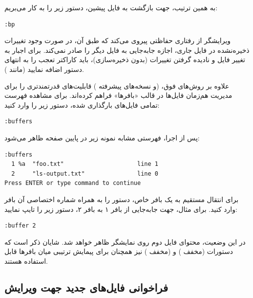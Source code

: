به همین ترتیب، جهت بازگشت به فایل پیشین، دستور زیر را به کار می‌بریم:

\begin{latin}
\begin{lstlisting}
:bp
\end{lstlisting}
\end{latin}

ویرایشگر  از رفتاری حفاظتی پیروی می‌کند که طبق آن، در صورت وجود تغییرات ذخیره‌نشده در فایل جاری، اجازه جابه‌جایی به فایل دیگر را صادر نمی‌کند. برای اجبار  به تغییر فایل و نادیده گرفتن تغییرات (بدون ذخیره‌سازی)، باید کاراکتر تعجب \cmd{!} را به انتهای دستور اضافه نمایید (مانند ).

علاوه بر روش‌های فوق،  (و نسخه‌های پیشرفته ) قابلیت‌های قدرتمندتری را برای مدیریت هم‌زمان فایل‌ها در قالب «بافرها» فراهم کرده‌اند. برای مشاهده فهرست تمامی فایل‌های بارگذاری شده، دستور زیر را وارد کنید:

\begin{latin}
\begin{lstlisting}
:buffers
\end{lstlisting}
\end{latin}

پس از اجرا، فهرستی مشابه نمونه زیر در پایین صفحه ظاهر می‌شود:

\begin{latin}
\begin{lstlisting}
:buffers
  1 %a  "foo.txt"                     line 1
  2     "ls-output.txt"               line 0
Press ENTER or type command to continue
\end{lstlisting}
\end{latin}

برای انتقال مستقیم به یک بافر خاص، دستور  را به همراه شماره اختصاصی آن بافر وارد کنید. برای مثال، جهت جابه‌جایی از بافر ۱ به بافر ۲، دستور زیر را تایپ نمایید:

\begin{latin}
\begin{lstlisting}
:buffer 2
\end{lstlisting}
\end{latin}

در این وضعیت، محتوای فایل دوم روی نمایشگر ظاهر خواهد شد. شایان ذکر است که دستورات  (مخفف ) و  (مخفف ) نیز همچنان برای پیمایش ترتیبی میان بافرها قابل استفاده هستند.

\subsection{فراخوانی فایل‌های جدید جهت ویرایش}

